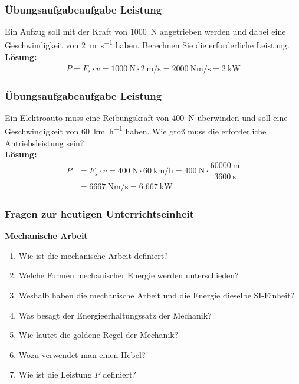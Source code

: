 \documentclass{beamer}
\begin{document}
\frame
{
  \frametitle{Übungsaufgabeaufgabe Leistung}
{
Ein Aufzug soll mit der Kraft von \SI{1000}{\newton} angetrieben werden und dabei eine Geschwindigkeit von \SI{2}{\meter\per\second} haben. Berechnen Sie die erforderliche Leistung.\\
}
{
\textbf{Lösung:}	
	\begin{align*}
	P=F_s\cdot v=\SI{1000}{\newton}\cdot\SI{2}{\meter\per\second}=\SI{2000}{\newton\meter\per\second}=\SI{2}{\kilo\watt}
	\end{align*}
}
}

\frame
{
  \frametitle{Übungsaufgabeaufgabe Leistung}
{
Ein Elektroauto muss eine Reibungskraft von \SI{400}{\newton} überwinden und soll eine Geschwindigkeit von \SI{60}{\kilo\meter\per\hour} haben. Wie groß muss die erforderliche Antriebsleistung sein?\\
}
{
\textbf{Lösung:}	
	\begin{align*}
	P&=F_s\cdot v=\SI{400}{\newton}\cdot\SI{60}{\kilo\meter\per\hour}=\SI{400}{\newton}\cdot\dfrac{\SI{60000}{\meter}}{\SI{3600}{\second}}\\&=\SI{6667}{\newton\meter\per\second}=\SI{6,667}{\kilo\watt}
	\end{align*}
}
}

\frame
{
  \frametitle{Fragen zur heutigen Unterrichtseinheit}
  \textbf{Mechanische Arbeit}
  \begin{enumerate}
  [default]
	\item Wie ist die mechanische Arbeit definiert?
	\item Welche Formen mechanischer Energie werden unterschieden?
	\item Weshalb haben die mechanische Arbeit und die Energie dieselbe SI-Einheit?
	\item Was besagt der Energieerhaltungssatz der Mechanik?
	\item Wie lautet die goldene Regel der Mechanik?
	\item Wozu verwendet man einen Hebel?
	\item Wie ist die Leistung $P$ definiert?
  \end{enumerate}
}
\end{document}
